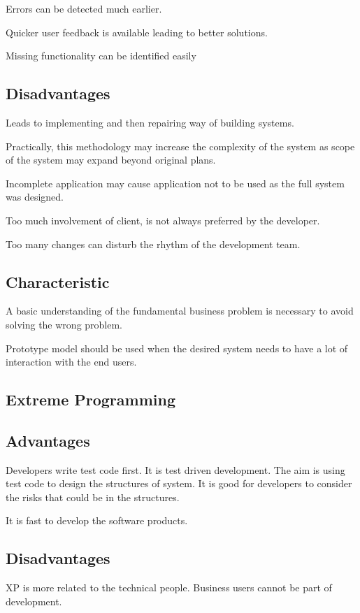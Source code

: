 Errors can be detected much earlier.

Quicker user feedback is available leading to better solutions.

Missing functionality can be identified easily

\subsection*{Disadvantages}

Leads to implementing and then repairing way of building systems.

Practically, this methodology may increase the complexity of the system as scope of the system may expand beyond original plans.

Incomplete application may cause application not to be used as the
full system was designed.

Too much involvement of client, is not always preferred by the developer.

Too many changes can disturb the rhythm of the development team.


\subsection*{Characteristic}
A basic understanding of the fundamental business problem is necessary to avoid solving the wrong problem.

Prototype model should be used when the desired system needs to have a lot of interaction with the end users.


\subsection*{Extreme Programming}

\subsection*{Advantages}
Developers write test code first. It is test driven development. The aim is using test code to design the structures of system. It is good for developers to consider the risks that could be in the structures.

It is fast to develop the software products.

\subsection*{Disadvantages}
XP is more related to the technical people. Business users cannot be part of development.

